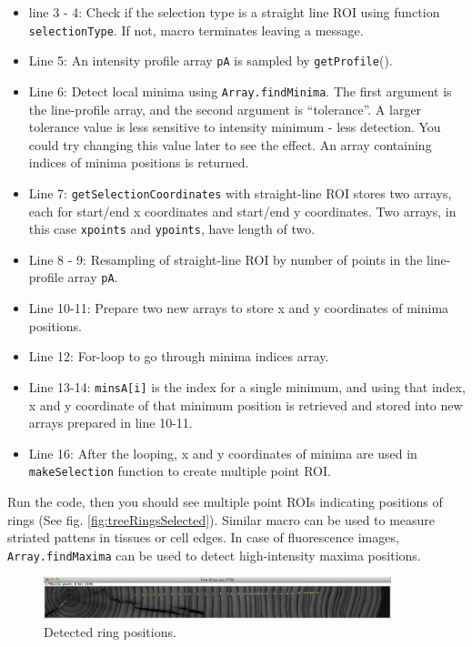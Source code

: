 \documentclass[11pt,a4paper,oneside]{report}
\newcommand{\ilcom}[1]{\texttt{\small#1}}
\begin{document}
\begin{itemize}
\item line 3 - 4:  Check if the selection type is a straight line ROI using function \ilcom{selectionType}. If not, macro terminates leaving a message.
\item Line 5: An intensity profile array \ilcom{pA} is sampled by \ilcom{getProfile}().
\item Line 6: Detect local minima using \ilcom{Array.findMinima}. The first argument is the line-profile array, and the second argument is ``tolerance''. A larger tolerance value is less sensitive to intensity minimum - less detection. You could try changing this value later to see the effect. An array containing indices of minima positions is returned. 
\item Line 7: \ilcom{getSelectionCoordinates} with straight-line ROI stores two arrays, each for start/end x coordinates and start/end y coordinates. Two arrays, in this case \ilcom{xpoints} and \ilcom{ypoints}, have length of two. 
\item Line 8 - 9: Resampling of straight-line ROI by number of points in the line-profile array \ilcom{pA}.
\item Line 10-11: Prepare two new arrays to store x and y coordinates of minima positions. 
\item Line 12: For-loop to go through minima indices array. 
\item Line 13-14: \ilcom{minsA[i]} is the index for a single minimum, and using that index, x and y coordinate of that minimum position is retrieved and stored into new arrays prepared in line 10-11. 
\item Line 16: After the looping, x and y coordinates of minima are used in \ilcom{makeSelection} function to create multiple point ROI. 
\end{itemize}

Run the code, then you should see multiple point ROIs indicating positions of rings (See fig. \ref{fig:treeRingsSelected}). Similar macro can be used to measure striated pattens in tissues or cell edges. In case of fluorescence images, \ilcom{Array.findMaxima} can be used to detect high-intensity maxima positions. 

\begin{figure}[h!]
\begin{center}
\includegraphics[width=0.9\textwidth]{fig/Tree_Rings_Minima.png}
\caption{Detected ring positions.}
\label{fig:treeRingsMinima}
\end{center}
\end{figure}
\end{document}
